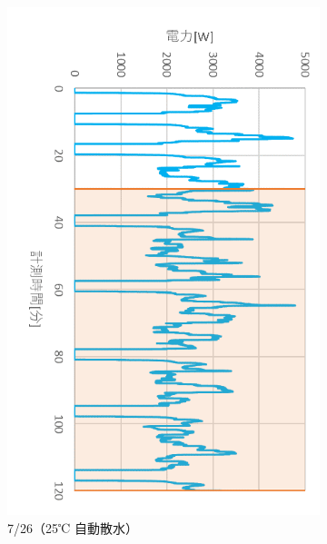 \documentclass[a4j,fleqn,dvipdfmx,uplatex]{jsarticle}
\begin{document}
\begin{figure}[htb]
\begin{subfigure}[b]{0.4\hsize}
      \includegraphics[width=\linewidth]{img/t_p/20220726.png}
      \caption{7/26（25℃ 自動散水）}
  \end{subfigure}
  \begin{subfigure}[b]{0.4\hsize}
      \centering

\end{subfigure}
\end{figure}
\end{document}
